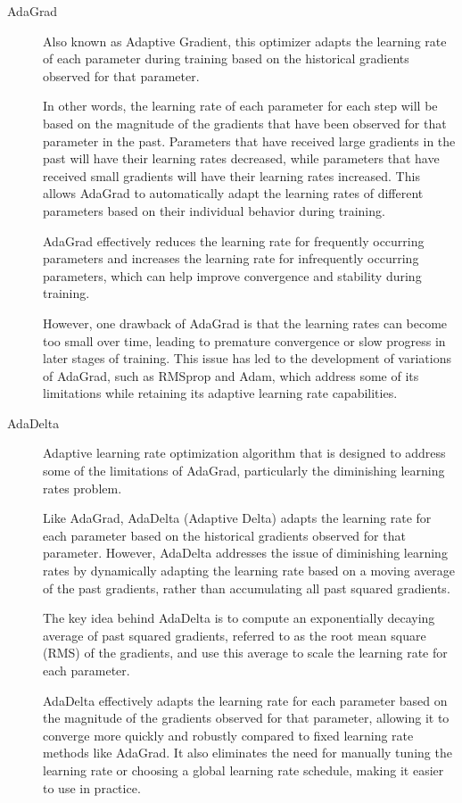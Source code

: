 \documentclass[a4paper]{report}
\begin{document}
\begin{description}
\item[AdaGrad]
Also known as Adaptive Gradient, this optimizer adapts the learning rate of each parameter during training based on the historical gradients observed for that parameter.

In other words, the learning rate of each parameter for each step will be based on the magnitude of the gradients that have been observed for that parameter in the past. Parameters that have received large gradients in the past will have their learning rates decreased, while parameters that have received small gradients will have their learning rates increased. This allows AdaGrad to automatically adapt the learning rates of different parameters based on their individual behavior during training.

AdaGrad effectively reduces the learning rate for frequently occurring parameters and increases the learning rate for infrequently occurring parameters, which can help improve convergence and stability during training. 

However, one drawback of AdaGrad is that the learning rates can become too small over time, leading to premature convergence or slow progress in later stages of training. This issue has led to the development of variations of AdaGrad, such as RMSprop and Adam, which address some of its limitations while retaining its adaptive learning rate capabilities.

\item[AdaDelta]
Adaptive learning rate optimization algorithm that is designed to address some of the limitations of AdaGrad, particularly the diminishing learning rates problem.

Like AdaGrad, AdaDelta (Adaptive Delta) adapts the learning rate for each parameter based on the historical gradients observed for that parameter. However, AdaDelta addresses the issue of diminishing learning rates by dynamically adapting the learning rate based on a moving average of the past gradients, rather than accumulating all past squared gradients.

The key idea behind AdaDelta is to compute an exponentially decaying average of past squared gradients, referred to as the root mean square (RMS) of the gradients, and use this average to scale the learning rate for each parameter.

AdaDelta effectively adapts the learning rate for each parameter based on the magnitude of the gradients observed for that parameter, allowing it to converge more quickly and robustly compared to fixed learning rate methods like AdaGrad. It also eliminates the need for manually tuning the learning rate or choosing a global learning rate schedule, making it easier to use in practice.


\end{description}
\end{document}
